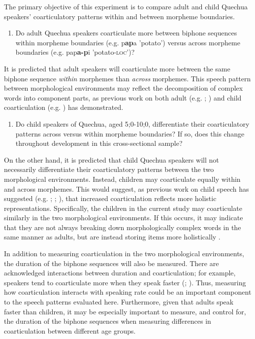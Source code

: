 \documentclass[a4paper,man,floatsintext,natbib,donotrepeattitle, apacite]{apa6}
\begin{document}
The primary objective of this experiment is to compare adult and child Quechua speakers' coarticulatory patterns within and between morpheme boundaries. 

\begin{enumerate}
    \item Do adult Quechua speakers coarticulate more between biphone sequences within morpheme boundaries (e.g. p\textbf{ap}a 'potato') versus across morpheme boundaries (e.g. pap\textbf{a-p}i 'potato-\textsc{loc}')? 
\end{enumerate}

It is predicted that adult speakers will coarticulate more between the same biphone sequence \textit{within} morphemes than \textit{across} morphemes. This speech pattern between morphological environments may reflect the decomposition of complex words into component parts, as previous work on both adult (e.g. \citealt{choEffectsMorphemeBoundaries2001}; \citealt{tomaschekHowAnticipatoryCoarticulation2019}) and child coarticulation (e.g. \citep{songEffectsCoarticulationMorphological2013}) has demonstrated.  

\begin{enumerate}[resume]
    \item Do child speakers of Quechua, aged 5;0-10;0, differentiate their coarticulatory patterns across versus within morpheme boundaries? If so, does this change throughout development in this cross-sectional sample? 
\end{enumerate}

On the other hand, it is predicted that child Quechua speakers will not necessarily differentiate their coarticulatory patterns between the two morphological environments. Instead, children may coarticulate equally within and across morphemes. This would suggest, as previous work on child speech has suggested (e.g. \citealt{noiraySpokenLanguageDevelopment2019}; \citealt{redfordGrammaticalWordProduction2018}; \citealt{zharkovaCoarticulationIndicatorSpeech2011}), that increased coarticulation reflects more holistic representations. Specifically, the children in the current study may coarticulate similarly in the two morphological environments. If this occurs, it may indicate that they are not always breaking down morphologically complex words in the same manner as adults, but are instead storing items more holistically \citep{redfordGrammaticalWordProduction2018}. 

In addition to measuring coarticulation in the two morphological environments, the duration of the biphone sequences will also be measured. There are acknowledged interactions between duration and coarticulation; for example, speakers tend to coarticulate more when they speak faster (\citealt{gayMechanismsControlSpeech1981}; \citealt{matthiesVariationAnticipatoryCoarticulation2001}). Thus, measuring how coarticulation interacts with speaking rate could be an important component to the speech patterns evaluated here. Furthermore, given that adults speak faster than children, it may be especially important to measure, and control for, the duration of the biphone sequences when measuring differences in coarticulation between different age groups. 
\end{document}
